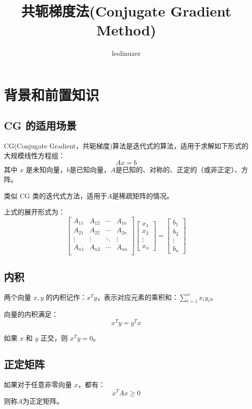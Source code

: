 \documentclass[12pt]{article}
\title{共轭梯度法(Conjugate Gradient Method)\cite{Conjugate_Gradient_Method_No_Pain}}
\author{leolinuxer}
\begin{document}
\maketitle
\tableofcontents
\section{背景和前置知识}
\subsection{CG 的适用场景}
CG(Conjugate Gradient，共轭梯度)算法是迭代式的算法，适用于求解如下形式的大规模线性方程组：
$$
Ax = b
$$
其中 $x$ 是未知向量，$b$是已知向量，$A$是已知的、对称的、正定的（或非正定）、方阵。

类似 CG 类的迭代式方法，适用于$A$是稀疏矩阵的情况。

上式的展开形式为：
$$
\begin{bmatrix}
A_{11} & A_{12} & \cdots & A_{1n} \\
A_{21} & A_{22} & \cdots & A_{2n} \\
\vdots & \vdots & \ddots & \vdots \\
A_{n1} & A_{n2} & \cdots & A_{nn} \\
\end{bmatrix}
\begin{bmatrix}
x_1 \\ x_2 \\ \vdots \\ x_n
\end{bmatrix} = 
\begin{bmatrix}
b_1 \\ b_2 \\ \vdots \\ b_n
\end{bmatrix}
$$

\subsection{内积}
两个向量 $x, y$ 的内积记作：$x^Ty$，表示对应元素的乘积和：$\sum_{i=1}^nx_iy_i$。

向量的内积满足：
$$
x^Ty = y^Tx
$$

如果 $x$ 和 $y$ 正交，则 $x^Ty = 0$。

\subsection{正定矩阵}
如果对于任意非零向量 $x$，都有：
$$
x^TAx \ge 0
$$
则称$A$为正定矩阵。
\end{document}
